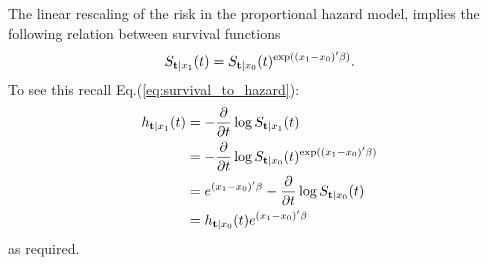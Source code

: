 The linear rescaling of the risk in the proportional hazard model, implies the following relation between survival functions
\begin{align}
\label{eq:survival_proportional_hazard}
	S_{\mathbf{t}|x_1} (t)=S_{\mathbf{t}|x_0} (t)^{\exp((x_1-x_0)'\beta)}.
\end{align}
To see this recall Eq.(\ref{eq:survival_to_hazard}):
\begin{align*}
h_{\mathbf{t}|x_1} (t) 
&=  - \frac{\partial}{\partial t} \log S_{\mathbf{t}|x_1} (t)  \\
&= - \frac{\partial}{\partial t} \log S_{\mathbf{t}|x_0} (t)^{\exp((x_1-x_0)'\beta)} \\
&= e^{(x_1-x_0)'\beta} - \frac{\partial}{\partial t}  \log S_{\mathbf{t}|x_0} (t) \\
&=  h_{\mathbf{t}|x_0} (t) e^{(x_1-x_0)'\beta} 
\end{align*}
as required.




